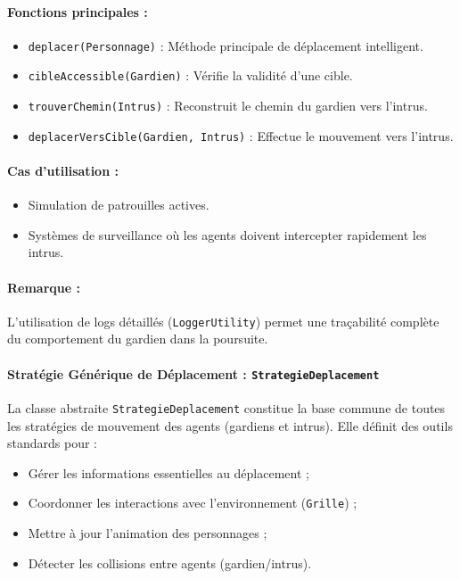 \paragraph{Fonctions principales :}
\begin{itemize}
    \item \texttt{deplacer(Personnage)} : Méthode principale de déplacement intelligent.
    \item \texttt{cibleAccessible(Gardien)} : Vérifie la validité d'une cible.
    \item \texttt{trouverChemin(Intrus)} : Reconstruit le chemin du gardien vers l'intrus.
    \item \texttt{deplacerVersCible(Gardien, Intrus)} : Effectue le mouvement vers l'intrus.
\end{itemize}

\paragraph{Cas d'utilisation :}
\begin{itemize}
    \item Simulation de patrouilles actives.
    \item Systèmes de surveillance où les agents doivent intercepter rapidement les intrus.
\end{itemize}

\paragraph{Remarque :}
L'utilisation de logs détaillés (\texttt{LoggerUtility}) permet une traçabilité complète du comportement du gardien dans la poursuite.

\paragraph{Stratégie Générique de Déplacement : \texttt{StrategieDeplacement}}

La classe abstraite \texttt{StrategieDeplacement} constitue la base commune de toutes les stratégies de mouvement des agents (gardiens et intrus).  
Elle définit des outils standards pour :
\begin{itemize}
    \item Gérer les informations essentielles au déplacement ;
    \item Coordonner les interactions avec l’environnement (\texttt{Grille}) ;
    \item Mettre à jour l'animation des personnages ;
    \item Détecter les collisions entre agents (gardien/intrus).
\end{itemize}

